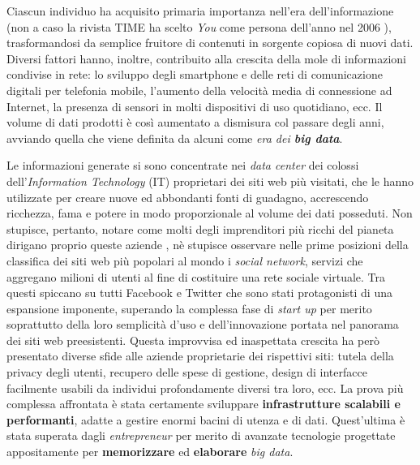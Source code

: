 Ciascun individuo ha acquisito primaria importanza nell’era dell’informazione (non a caso la rivista TIME ha scelto \textit{You} come persona dell'anno 
nel 2006 \cite{URL:TIME1}\cite{URL:TIME2}), 
trasformandosi da semplice fruitore di contenuti in sorgente copiosa di nuovi dati. Diversi fattori hanno, inoltre, contribuito alla crescita della mole di informazioni condivise in rete: lo sviluppo degli 
smartphone e delle reti di comunicazione digitali per telefonia mobile, l’aumento della velocità media di connessione ad Internet, la presenza di sensori in molti dispositivi di uso quotidiano, ecc.
Il volume di dati prodotti è così aumentato a dismisura col passare degli anni, avviando quella che viene definita da alcuni come \textit{era dei \textbf{big data}}.

Le informazioni generate si sono concentrate nei \textit{data center} dei colossi dell’\textit{Information Technology} (IT) proprietari dei siti web più visitati, che 
le hanno utilizzate per creare nuove ed abbondanti fonti di guadagno, accrescendo ricchezza, fama e potere in modo proporzionale 
al volume dei dati posseduti. Non stupisce, pertanto, notare come molti degli imprenditori più ricchi del pianeta dirigano proprio queste aziende \cite{URL:top30ent}, nè stupisce osservare 
nelle prime posizioni della classifica dei siti web più popolari al mondo \cite{URL:alexatop} i \textit{social network}, servizi che aggregano milioni di utenti al fine di costituire una rete sociale virtuale.
Tra questi spiccano su tutti Facebook e Twitter che sono stati protagonisti di una espansione imponente, superando la complessa fase di \textit{start up} per merito soprattutto
della loro semplicità d'uso e dell'innovazione portata nel panorama dei siti web preesistenti.
Questa improvvisa ed inaspettata crescita ha però presentato diverse sfide alle aziende proprietarie dei rispettivi siti: tutela della privacy degli utenti, recupero delle spese
di gestione, design di interfacce facilmente usabili da individui profondamente diversi tra loro, ecc. La prova più complessa affrontata è stata certamente 
sviluppare \textbf{infrastrutture scalabili e performanti}, adatte a gestire enormi bacini di utenza e di dati. Quest’ultima è stata superata dagli \textit{entrepreneur} 
per merito di avanzate tecnologie progettate appositamente per \textbf{memorizzare} ed \textbf{elaborare} \textit{big data}.

